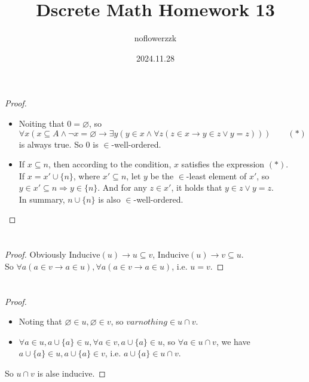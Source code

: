 \documentclass{article}
\title{Dscrete Math Homework 13}
\author{noflowerzzk}
\date{2024.11.28}
\begin{document}
\maketitle

\section{}

\begin{proof}\quad
    \begin{itemize}
        \item Noiting that $0 = \varnothing$, so $\forall x(x\subseteq A\wedge\neg x=\varnothing\rightarrow\exists y(y\in x \wedge\forall z(z\in x\to y\in z\lor y=z)))\qquad (*)$ is always true. So $0$ is $\in$-well-ordered.
        \item If $x \subseteq n$, then according to the condition, $x$ satisfies the expression $(*)$. \\
        If $x = x' \cup \{n\}$, where $x' \subseteq n$, let $y$ be the $\in$-least element of $x'$, so $y \in x' \subseteq n \Rightarrow y \in \{n\}$. And for any $z \in x'$, it holds that $y \in z \lor y = z$. \\
        In summary, $n \cup \{n\}$ is also $\in$-well-ordered.
    \end{itemize} 
\end{proof}

\section{}

\begin{proof}
    Obviously $\mathrm{Inducive}(u) \rightarrow u \subseteq v$, $\mathrm{Inducive}(u) \rightarrow v \subseteq u$. \\
    So $\forall a(a \in v \rightarrow a \in u), \forall a(a \in v \rightarrow a \in u)$, i.e. $u = v$.
\end{proof}

\section{}

\begin{proof}\quad
    \begin{itemize}
        \item Noting that $\varnothing \in u, \varnothing \in v$, so $varnothing \in u \cap v$. 
        \item $\forall a \in u, a \cup \{a\} \in u, \forall a \in v, a \cup \{a\} \in u$, so $\forall a \in u \cap v$, we have $a \cup \{a\} \in u, a \cup \{a\} \in v$, i.e. $a \cup \{a\} \in u \cap v$.
    \end{itemize}
    So  $u \cap v$ is alse inducive.
\end{proof}
\end{document}
